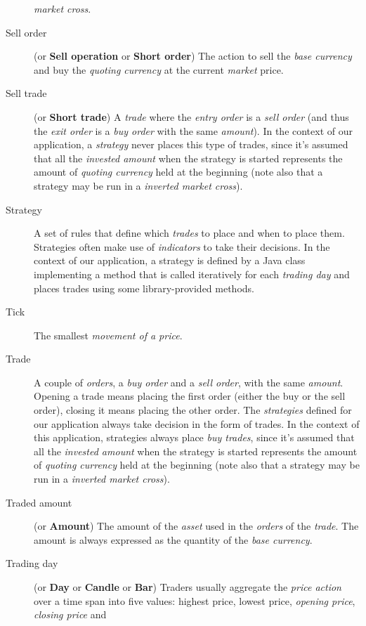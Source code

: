 \begin{description}
		\textit{market cross}.
	\item[Sell order] (or \textbf{Sell operation} or \textbf{Short order})
		The action to sell the \textit{base currency} and buy the
		\textit{quoting currency} at the current \textit{market} price.
	\item[Sell trade] (or \textbf{Short trade}) A \textit{trade} where the
		\textit{entry order} is a \textit{sell order} (and thus the
		\textit{exit order} is a \textit{buy order} with the same
		\textit{amount}). In the context of our application, a
		\textit{strategy} never places this type of trades, since it's
		assumed that all the \textit{invested amount} when the strategy
		is started represents the amount of \textit{quoting currency}
		held at the beginning (note also that a strategy may be run in a
		\textit{inverted market cross}).
	\item[Strategy] A set of rules that define which \textit{trades} to
		place and when to place them. Strategies often make use of
		\textit{indicators} to take their decisions. In the context of
		our application, a strategy is defined by a Java class
		implementing a method that is called iteratively for each
		\textit{trading day} and places trades using some
		library-provided methods.
	\item[Tick] The smallest \textit{movement of a price}.
	\item[Trade] A couple of \textit{orders}, a \textit{buy order} and a
		\textit{sell order}, with the same \textit{amount}. Opening a
		trade means placing the first order (either the buy or the sell
		order), closing it means placing the other order. The
		\textit{strategies} defined for our application always take
		decision in the form of trades. In the context of this
		application, strategies always place \textit{buy trades}, since
		it's assumed that all the \textit{invested amount} when the
		strategy is started represents the amount of \textit{quoting
		currency} held at the beginning (note also that a strategy may
		be run in a \textit{inverted market cross}).
	\item[Traded amount] (or \textbf{Amount}) The amount of the
		\textit{asset} used in the \textit{orders} of the
		\textit{trade}. The amount is always expressed as the quantity
		of the \textit{base currency}.
	\item[Trading day] (or \textbf{Day} or \textbf{Candle} or \textbf{Bar})
		Traders usually aggregate the \textit{price action} over a time
		span into five values: highest price, lowest price,
		\textit{opening price}, \textit{closing price} and

\end{description}
